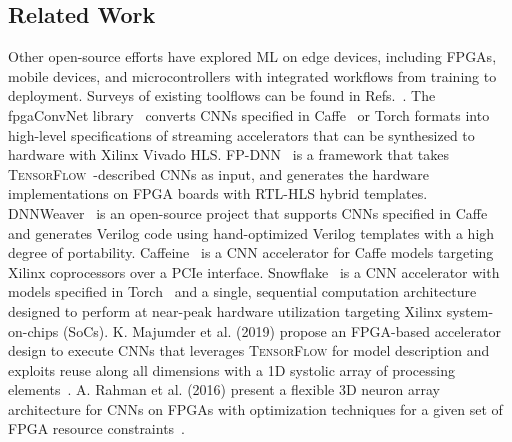 \documentclass[tinyml]{acmart}
\begin{document}

\subsection*{Related Work}

Other open-source efforts have explored ML on edge devices, including FPGAs, mobile devices, and microcontrollers with integrated workflows from training to deployment.
Surveys of existing toolflows can be found in Refs.~\cite{2018arXiv180305900V,10.1145/3289185,Shawahna_2019,abdelouahab2018accelerating}.
The fpgaConvNet library~\cite{venieris2017fpgaconvnet,venieris2017fpga,venieris2017fpl,venieris2016fccm} converts CNNs specified in Caffe~\cite{jia2014caffe} or Torch formats into high-level specifications of streaming accelerators that can be synthesized to hardware with Xilinx Vivado HLS.
FP-DNN~\cite{fpdnn} is a framework that takes \textsc{TensorFlow}~\cite{tensorflow2015-whitepaper}-described CNNs as input, and generates the hardware implementations on FPGA boards with RTL-HLS hybrid templates.
DNNWeaver~\cite{dnnweaver:micro16} is an open-source 
project that supports CNNs specified in Caffe and generates Verilog code using hand-optimized Verilog templates with a high degree of portability.
Caffeine~\cite{caffeinatedFPGAs} is a CNN accelerator for Caffe models targeting Xilinx coprocessors over a PCIe interface.
Snowflake~\cite{snowflake} is a CNN accelerator with models specified in Torch~\cite{torch} and a single, sequential computation architecture designed to perform at near-peak hardware utilization targeting Xilinx system-on-chips (SoCs).
K. Majumder et al. (2019) propose an FPGA-based accelerator design to execute CNNs that leverages \textsc{TensorFlow} for model description and exploits reuse along all dimensions with a 1D systolic array of processing elements~\cite{majumder2019flexible}.
A. Rahman et al. (2016) present a flexible 3D neuron array architecture for CNNs on FPGAs with optimization techniques for a given set of FPGA resource constraints~\cite{7459526}.
\end{document}

